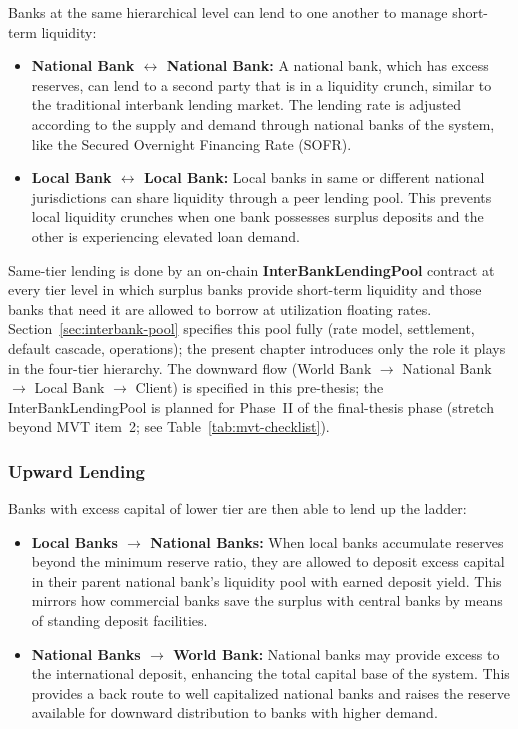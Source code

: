 \documentclass[12pt,a4paper]{report}
\begin{document}
Banks at the same hierarchical level can lend to one another to manage short-term liquidity:

\begin{itemize}[noitemsep]
\item \textbf{National Bank $\leftrightarrow$ National Bank:} A national bank, which has excess reserves, can lend to a second party that is in a liquidity crunch, similar to the traditional interbank lending market. The lending rate is adjusted according to the supply and demand through national banks of the system, like the Secured Overnight Financing Rate (SOFR).
\item \textbf{Local Bank $\leftrightarrow$ Local Bank:} Local banks in same or different national jurisdictions can share liquidity through a peer lending pool. This prevents local liquidity crunches when one bank possesses surplus deposits and the other is experiencing elevated loan demand.
\end{itemize}

Same-tier lending is done by an on-chain \textbf{InterBankLendingPool} contract at every tier level in which surplus banks provide short-term liquidity and those banks that need it are allowed to borrow at utilization floating rates. Section~\ref{sec:interbank-pool} specifies this pool fully (rate model, settlement, default cascade, operations); the present chapter introduces only the role it plays in the four-tier hierarchy. The downward flow (World Bank $\to$ National Bank $\to$ Local Bank $\to$ Client) is specified in this pre-thesis; the InterBankLendingPool is planned for Phase~II of the final-thesis phase (stretch beyond MVT item~2; see Table~\ref{tab:mvt-checklist}).

\subsubsection{Upward Lending}

Banks with excess capital of lower tier are then able to lend up the ladder:

\begin{itemize}[noitemsep]
\item \textbf{Local Banks $\to$ National Banks:} When local banks accumulate reserves beyond the minimum reserve ratio, they are allowed to deposit excess capital in their parent national bank's liquidity pool with earned deposit yield. This mirrors how commercial banks save the surplus with central banks by means of standing deposit facilities.
\item \textbf{National Banks $\to$ World Bank:} National banks may provide excess to the international deposit, enhancing the total capital base of the system. This provides a back route to well capitalized national banks and raises the reserve available for downward distribution to banks with higher demand.
\end{itemize}
\end{document}
